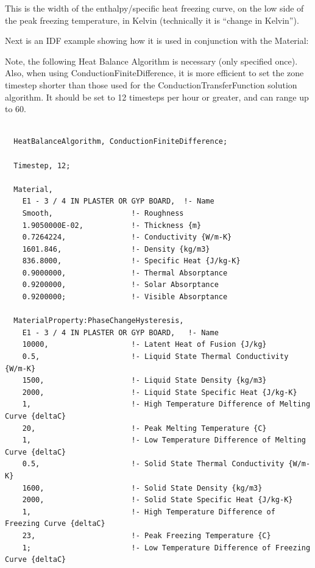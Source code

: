 This is the width of the enthalpy/specific heat freezing curve, on the low side of the peak freezing temperature, in Kelvin (technically it is ``change in Kelvin'').

Next is an IDF example showing how it is used in conjunction with the Material:

Note, the following Heat Balance Algorithm is necessary (only specified once). Also, when using ConductionFiniteDifference, it is more efficient to set the zone timestep shorter than those used for the ConductionTransferFunction solution algorithm. It should be set to 12 timesteps per hour or greater, and can range up to 60.

\begin{lstlisting}

  HeatBalanceAlgorithm, ConductionFiniteDifference;

  Timestep, 12;

  Material,
    E1 - 3 / 4 IN PLASTER OR GYP BOARD,  !- Name
    Smooth,                  !- Roughness
    1.9050000E-02,           !- Thickness {m}
    0.7264224,               !- Conductivity {W/m-K}
    1601.846,                !- Density {kg/m3}
    836.8000,                !- Specific Heat {J/kg-K}
    0.9000000,               !- Thermal Absorptance
    0.9200000,               !- Solar Absorptance
    0.9200000;               !- Visible Absorptance

  MaterialProperty:PhaseChangeHysteresis,
    E1 - 3 / 4 IN PLASTER OR GYP BOARD,   !- Name
    10000,                   !- Latent Heat of Fusion {J/kg}
    0.5,                     !- Liquid State Thermal Conductivity {W/m-K}
    1500,                    !- Liquid State Density {kg/m3}
    2000,                    !- Liquid State Specific Heat {J/kg-K}
    1,                       !- High Temperature Difference of Melting Curve {deltaC}
    20,                      !- Peak Melting Temperature {C}
    1,                       !- Low Temperature Difference of Melting Curve {deltaC}
    0.5,                     !- Solid State Thermal Conductivity {W/m-K}
    1600,                    !- Solid State Density {kg/m3}
    2000,                    !- Solid State Specific Heat {J/kg-K}
    1,                       !- High Temperature Difference of Freezing Curve {deltaC}
    23,                      !- Peak Freezing Temperature {C}
    1;                       !- Low Temperature Difference of Freezing Curve {deltaC}

\end{lstlisting}

